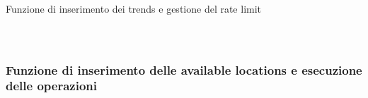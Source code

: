 \documentclass[xcolor=svgnames, aspectratio=169]{beamer}
\begin{document}
\begin{frame}{Funzione di inserimento dei trends e gestione del rate limit}
    \begin{columns}[t]
        
        \vspace*{-32pt}
        \begin{figure}[H]
            \centering
            \noindent{}
        \end{figure}
    \end{columns}
\end{frame}


\subsubsection{Funzione di inserimento delle available locations e esecuzione delle operazioni}
\end{document}
